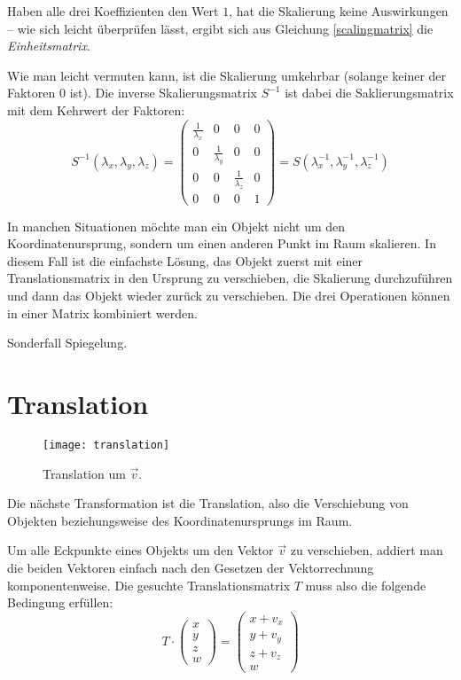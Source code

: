 Haben alle drei Koeffizienten den Wert $1$, hat die Skalierung keine Auswirkungen -- wie sich leicht überprüfen lässt, ergibt sich aus Gleichung \ref{scalingmatrix} die \emph{Einheitsmatrix}.

Wie man leicht vermuten kann, ist die Skalierung umkehrbar (solange keiner der Faktoren 0 ist). Die inverse Skalierungsmatrix $S^{-1}$ ist dabei die Saklierungsmatrix mit dem Kehrwert der Faktoren:
\begin{equation}
 S^{-1}{(\lambda_x, \lambda_y, \lambda_z)} =
 \begin{pmatrix}
  \frac{1}{\lambda_x} & 0 & 0 & 0 \\
  0 & \frac{1}{\lambda_y} & 0 & 0 \\
  0 & 0 & \frac{1}{\lambda_z} & 0 \\
  0 & 0 & 0 & 1
 \end{pmatrix}
 = S{(\lambda_x^{-1}, \lambda_y^{-1}, \lambda_z^{-1})}
\end{equation}


In manchen Situationen möchte man ein Objekt nicht um den Koordinatenursprung, sondern um einen anderen Punkt im Raum skalieren. In diesem Fall ist die einfachste Lösung, das Objekt zuerst mit einer Translationsmatrix in den Ursprung zu verschieben, die Skalierung durchzuführen und dann das Objekt wieder zurück zu verschieben. Die drei Operationen können in einer Matrix kombiniert werden.


Sonderfall Spiegelung.

\section{Translation}
\label{translation}

\begin{wrapfigure}{r}{0.5\textwidth}
  \texttt{[image: translation]}
  \vspace{-10pt}
  \caption{Translation um $\vec v$.}
\end{wrapfigure}

Die nächste Transformation ist die Translation, also die Verschiebung von Objekten beziehungsweise des Koordinatenursprungs im Raum.

Um alle Eckpunkte eines Objekts um den Vektor $\vec v$ zu verschieben, addiert man die beiden Vektoren einfach nach den Gesetzen der Vektorrechnung komponentenweise. Die gesuchte Translationsmatrix $T$ muss also die folgende Bedingung erfüllen:
\begin{equation}
 T \cdot 
 \begin{pmatrix}
  x \\
  y \\
  z \\
  w
 \end{pmatrix}
 =
 \begin{pmatrix}
  x + v_x \\
  y + v_y \\
  z + v_z \\
  w
 \end{pmatrix}
\end{equation}

